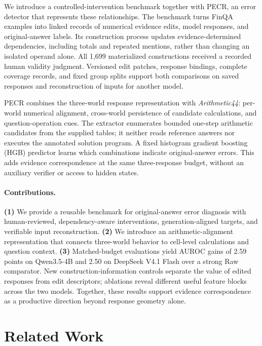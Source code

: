 We introduce a controlled-intervention benchmark together with PECR, an error detector that represents these relationships. The benchmark turns FinQA examples into linked records of numerical evidence edits, model responses, and original-answer labels. Its construction process updates evidence-determined dependencies, including totals and repeated mentions, rather than changing an isolated operand alone. All 1,699 materialized constructions received a recorded human validity judgment. Versioned edit patches, response bindings, complete coverage records, and fixed group splits support both comparisons on saved responses and reconstruction of inputs for another model.

PECR combines the three-world response representation with \emph{Arithmetic44}: per-world numerical alignment, cross-world persistence of candidate calculations, and question-operation cues. The extractor enumerates bounded one-step arithmetic candidates from the supplied tables; it neither reads reference answers nor executes the annotated solution program. A fixed histogram gradient boosting (HGB) predictor learns which combinations indicate original-answer errors. This adds evidence correspondence at the same three-response budget, without an auxiliary verifier or access to hidden states.

\paragraph{Contributions.}
\textbf{(1)} We provide a reusable benchmark for original-answer error diagnosis with human-reviewed, dependency-aware interventions, generation-aligned targets, and verifiable input reconstruction. \textbf{(2)} We introduce an arithmetic-alignment representation that connects three-world behavior to cell-level calculations and question context. \textbf{(3)} Matched-budget evaluations yield AUROC gains of 2.59 points on Qwen3.5-4B and 2.50 on DeepSeek V4.1 Flash over a strong Raw comparator. New construction-information controls separate the value of edited responses from edit descriptors; ablations reveal different useful feature blocks across the two models. Together, these results support evidence correspondence as a productive direction beyond response geometry alone.

\section{Related Work}
